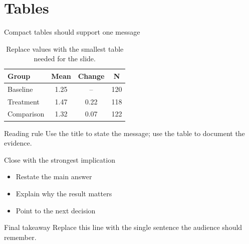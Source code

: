 \section{Tables}

\begin{frame}{Compact tables should support one message}
\begin{table}
\centering
\begin{tabular}{lccc}
\toprule
Group & Mean & Change & N \\
\midrule
Baseline & 1.25 & -- & 120 \\
Treatment & 1.47 & 0.22 & 118 \\
Comparison & 1.32 & 0.07 & 122 \\
\bottomrule
\end{tabular}
\caption{Replace values with the smallest table needed for the slide.}
\end{table}
\vfill
\begin{exampleblock}{Reading rule}
Use the title to state the message; use the table to document the evidence.
\end{exampleblock}
\end{frame}

\begin{frame}{Close with the strongest implication}
\begin{itemize}
  \setlength{\itemsep}{7pt}
  \item Restate the main answer
  \item Explain why the result matters
  \item Point to the next decision
\end{itemize}
\vfill
\begin{block}{Final takeaway}
Replace this line with the single sentence the audience should remember.
\end{block}
\end{frame}
